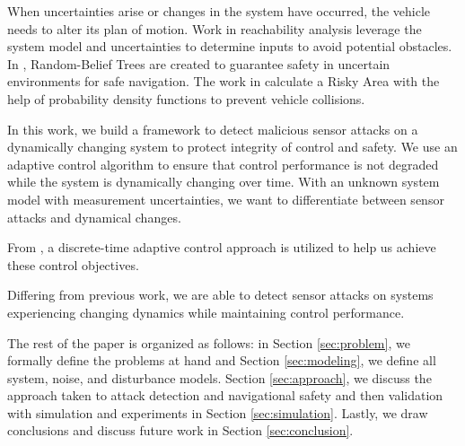 When uncertainties arise or changes in the system have occurred, the vehicle needs to alter its plan of motion. Work in reachability analysis \cite{8046382,7799325,5980268} leverage the system model and uncertainties to determine inputs to avoid potential obstacles. In \cite{5980508}, Random-Belief Trees are created to guarantee safety in uncertain environments for safe navigation. The work in \cite{6934041} calculate a Risky Area with the help of probability density functions to prevent vehicle collisions. 


In this work, we build a framework to detect malicious sensor attacks on a dynamically changing system to protect integrity of control and safety. We use an adaptive control algorithm to ensure that control performance is not degraded while the system is dynamically changing over time. With an unknown system model with measurement uncertainties, we want to differentiate between sensor attacks and dynamical changes.

 From \cite{tao2003adaptive,Goodwin1643720}, a  discrete-time adaptive control approach is utilized to help us achieve these control objectives.

Differing from previous work, we are able to detect sensor attacks on systems experiencing changing dynamics while maintaining control performance.

The rest of the paper is organized as follows: in Section \ref{sec:problem}, we formally define the problems at hand and Section \ref{sec:modeling}, we define all system, noise, and disturbance models. Section \ref{sec:approach}, we discuss the approach taken to attack detection and navigational safety and then validation with simulation and experiments in Section \ref{sec:simulation}. Lastly, we draw conclusions and discuss future work in Section \ref{sec:conclusion}.


